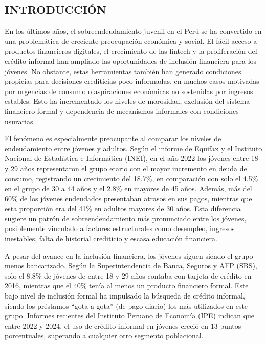 \documentclass[10pt]{article}
\begin{document}
\begin{multicols}{2}
\fontsize{10}{12}\selectfont

\section{INTRODUCCIÓN}

En los últimos años, el sobreendeudamiento juvenil en el Perú se ha convertido en una problemática de creciente preocupación económica y social. El fácil acceso a productos financieros digitales, el crecimiento de las fintech y la proliferación del crédito informal han ampliado las oportunidades de inclusión financiera para los jóvenes. No obstante, estas herramientas también han generado condiciones propicias para decisiones crediticias poco informadas, en muchos casos motivadas por urgencias de consumo o aspiraciones económicas no sostenidas por ingresos estables. Esto ha incrementado los niveles de morosidad, exclusión del sistema financiero formal y dependencia de mecanismos informales con condiciones usurarias.

El fenómeno es especialmente preocupante al comparar los niveles de endeudamiento entre jóvenes y adultos. Según el informe de Equifax y el Instituto Nacional de Estadística e Informática (INEI), en el año 2022 los jóvenes entre 18 y 29 años representaron el grupo etario con el mayor incremento en deuda de consumo, registrando un crecimiento del 18.7\%, en comparación con solo el 4.5\% en el grupo de 30 a 44 años y el 2.8\% en mayores de 45 años. Además, más del 60\% de los jóvenes endeudados presentaban atrasos en sus pagos, mientras que esta proporción era del 41\% en adultos mayores de 30 años. Esta diferencia sugiere un patrón de sobreendeudamiento más pronunciado entre los jóvenes, posiblemente vinculado a factores estructurales como desempleo, ingresos inestables, falta de historial crediticio y escasa educación financiera.

A pesar del avance en la inclusión financiera, los jóvenes siguen siendo el grupo menos bancarizado. Según la Superintendencia de Banca, Seguros y AFP (SBS), solo el 8.8\% de jóvenes de entre 18 y 29 años contaba con tarjeta de crédito en 2016, mientras que el 40\% tenía al menos un producto financiero formal. Este bajo nivel de inclusión formal ha impulsado la búsqueda de crédito informal, siendo los préstamos “gota a gota” (de pago diario) los más utilizados en este grupo. Informes recientes del Instituto Peruano de Economía (IPE) indican que entre 2022 y 2024, el uso de crédito informal en jóvenes creció en 13 puntos porcentuales, superando a cualquier otro segmento poblacional.


\end{multicols}
\end{document}
